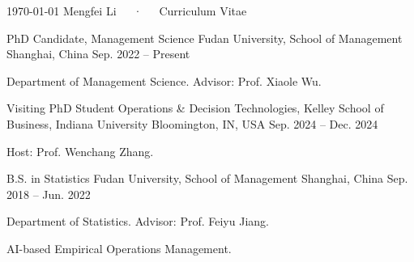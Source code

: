 \documentclass[10pt, letterpaper]{awesome-cv}
\begin{document}
\makecvheader
\makecvfooter
  {\today}
  {Mengfei Li~~~·~~~Curriculum Vitae}
  {\thepage}

\begin{cventries}
  \cventry
    {PhD Candidate, Management Science}
    {Fudan University, School of Management}
    {Shanghai, China}
    {Sep. 2022 -- Present}
    {
      \begin{cvitems}
        \item {Department of Management Science. Advisor: Prof. Xiaole Wu.}
      \end{cvitems}
    }

  \cventry
    {Visiting PhD Student}
    {Operations \& Decision Technologies, Kelley School of Business, Indiana University}
    {Bloomington, IN, USA}
    {Sep. 2024 -- Dec. 2024}
    {
      \begin{cvitems}
        \item {Host: Prof. Wenchang Zhang.}
      \end{cvitems}
    }

  \cventry
    {B.S. in Statistics}
    {Fudan University, School of Management}
    {Shanghai, China}
    {Sep. 2018 -- Jun. 2022}
    {
      \begin{cvitems}
        \item {Department of Statistics. Advisor: Prof. Feiyu Jiang.}
      \end{cvitems}
    }
\end{cventries}

\begin{cvparagraph}
AI-based Empirical Operations Management.
\end{cvparagraph}
\end{document}
